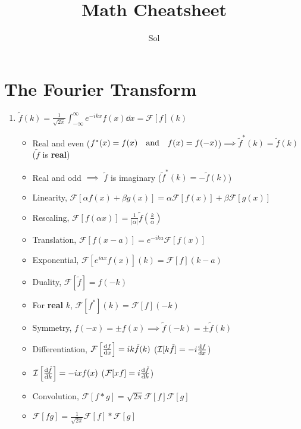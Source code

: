 \documentclass{article}
\theoremstyle{remark}
\theoremstyle{remark}
\begin{document}
    \title{Math Cheatsheet}
    \author{Sol}
    \maketitle

    \section*{The Fourier Transform}
    \begin{enumerate}
        \item $\tilde{f}(k) = \frac{1}{\sqrt{2\pi}}\int_{-\infty}^{\infty} e^{-ikx}f(x) \dd x = \mathcal{F}[f](k)$
                \begin{itemize}
                    \item Real and even ($f^*(x)=f(x) \qand f(x)=f(-x)$)$\implies \tilde{f}^*(k)=\tilde{f}(k) $ ($\tilde{f}$ is \textbf{real})
                    \item Real and odd $\implies$ $\tilde{f}$ is imaginary ($\tilde{f}^*(k)=-\tilde{f}(k) $)
                    \item Linearity, $\mathcal{F}[\alpha f(x)+\beta g(x)]=\alpha\mathcal{F}[f(x)]+\beta\mathcal{F}[g(x)] $
                    \item Rescaling, $\mathcal{F}[f(\alpha x)] = \frac{1}{|\alpha|}\tilde{f}\left(\frac{k}{\alpha}\right) $
                    \item Translation, $\mathcal{F}[f(x-a)]=e^{-ika}\mathcal{F}[f(x)] $
                    \item Exponential, $\mathcal{F}[e^{iax}f(x)](k)=\mathcal{F}[f](k-a) $
                    \item Duality, $\mathcal{F}[\tilde{f}]=f(-k) $
                    \item For \textbf{real} $k$, $\mathcal{F}[f^*](k)=\mathcal{F}[f](-k) $
                    \item Symmetry, $f(-x)=\pm f(x)\implies\tilde{f}(-k)=\pm\tilde{f}(k) $
                    \item Differentiation, $\mathcal{F}\left[\dv{f}{x}\right]=ik\tilde{f}(k) $ ($\mathcal{I}[k\tilde{f}]=-i\dv{f}{x} $)
                    \item $\mathcal{I}\left[\dv{\tilde{f}}{k}\right]=-ixf(x) $ ($\mathcal{F}[xf]=i\dv{\tilde{f}}{k} $)
                    \item Convolution, $\mathcal{F}[f*g]=\sqrt{2\pi}\mathcal{F}[f]\mathcal{F}[g] $
                    \item $\mathcal{F}[fg]=\frac{1}{\sqrt{2\pi}}\mathcal{F}[f]*\mathcal{F}[g] $

\end{itemize}
\end{enumerate}
\end{document}
